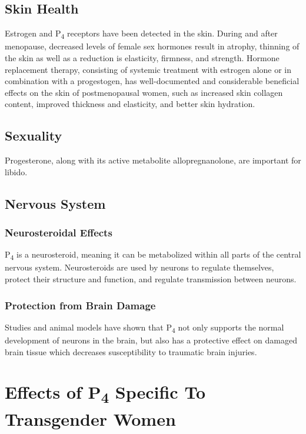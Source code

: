 \documentclass[
	secnumdepth=3, %
]{kaohandt}
\newcommand\tsub[1]{\textsubscript{#1}}
\begin{document}
\subsection{Skin Health}
Estrogen and P\tsub{4} receptors have been detected in the skin. During and after menopause, decreased levels of female sex hormones result in atrophy, thinning of the skin as well as a reduction is elasticity, firmness, and strength. Hormone replacement therapy, consisting of systemic treatment with estrogen alone or in combination with a progestogen, has well-documented and considerable beneficial effects on the skin of postmenopausal women, such as increased skin collagen content, improved thickness and elasticity, and better skin hydration.

\subsection{Sexuality}
Progesterone, along with its active metabolite allopregnanolone, are important for libido.

\subsection{Nervous System}
\subsubsection{Neurosteroidal Effects}
P\tsub{4} is a neurosteroid, meaning it can be metabolized within all parts of the central nervous system. Neurosteroids are used by neurons to regulate themselves, protect their structure and function, and regulate transmission between neurons. 

\subsubsection{Protection from Brain Damage}
Studies and animal models have shown that P\tsub{4} not only supports the normal development of neurons in the brain, but also has a protective effect on damaged brain tissue which decreases susceptibility to traumatic brain injuries.

\section{Effects of P\tsub{4} Specific To Transgender Women}
\end{document}
